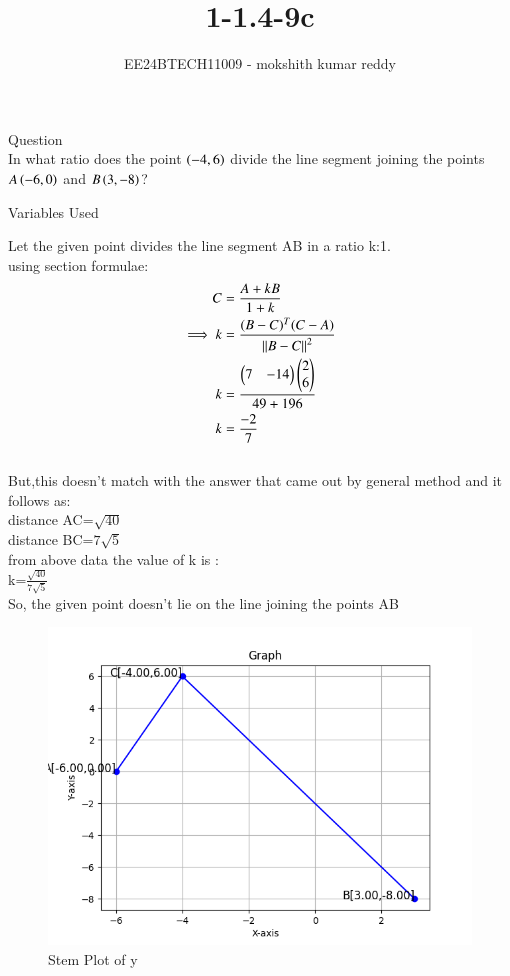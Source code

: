 \documentclass[journal]{IEEEtran}
\begin{document}

\vspace{3cm}

\title{1-1.4-9c}
\author{EE24BTECH11009 - mokshith kumar reddy}
{\let\newpage\relax\maketitle}

\renewcommand{\thefigure}{\theenumi}
\renewcommand{\thetable}{\theenumi}
\setlength{\intextsep}{10pt} %


\renewcommand{\thetable}{\theenumi}
Question\\
 In what ratio does the point $\left(-4,6\right)$ divide the line segment joining the points $A\left(-6,0\right)$ and $B\left(3,-8\right)$?\\
\solution
\begin{table}[h]
    \centering
    
    \caption{Variables Used}
    \label{tab1.0}
\end{table}
Let the given point divides the line segment AB in a ratio k:1.\\
using section formulae:\\
\begin{align}
C&=\frac{A+kB}{1+k}\\
\implies
k&=\frac{(B-C)^T(C-A)}{\left\vert\left\vert B-C\right\vert\right\vert^2}\\
k&=\frac{
\begin{pmatrix}
7 & -14
\end{pmatrix}
\begin{pmatrix}
2\\
6
\end{pmatrix}
}{49+196}\\
k&=\frac{-2}{7}\\
\end{align}\\
But,this doesn't match with the answer that came out by general method and it follows as:\\
distance AC=$\sqrt{40}$\\
distance BC=$7\sqrt{5}$\\
from above data the value of k is :\\
k=$\frac{\sqrt{40}}{7\sqrt{5}}$\\
So, the given point doesn't lie on the line joining the points AB
\begin{figure}[h!]
   \centering
   \includegraphics[width=0.7\linewidth]{figs/plot.png}
   \caption{Stem Plot of y}
   \label{stemplot}
\end{figure}
\end{document}
